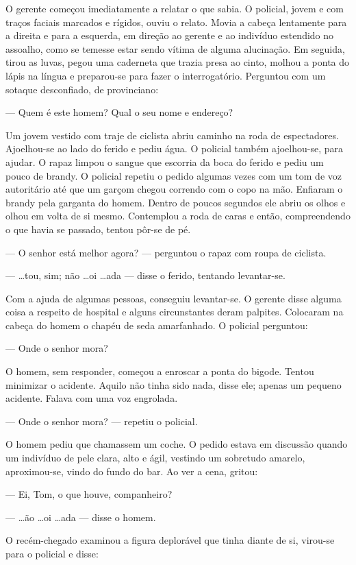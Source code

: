 O gerente começou imediatamente a relatar o que sabia. O policial,
jovem e com traços faciais marcados e rígidos, ouviu o relato. Movia a
cabeça lentamente para a direita e para a esquerda, em direção ao
gerente e ao indivíduo estendido no assoalho, como se temesse estar
sendo vítima de alguma alucinação. Em seguida, tirou as luvas, pegou
uma caderneta que trazia presa ao cinto, molhou a ponta do lápis na
língua e preparou-se para fazer o interrogatório. Perguntou com um
sotaque desconfiado, de provinciano:

--- Quem é este homem? Qual o seu nome e endereço?

Um jovem vestido com traje de ciclista abriu caminho na roda de
espectadores. Ajoelhou-se ao lado do ferido e pediu água. O policial
também ajoelhou-se, para ajudar. O rapaz limpou o sangue que
escorria da boca do ferido e pediu um pouco de brandy. O policial
repetiu o pedido algumas vezes com um tom de voz autoritário até que
um garçom chegou correndo com o copo na mão. Enfiaram o brandy pela
garganta do homem. Dentro de poucos segundos ele abriu os olhos e
olhou em volta de si mesmo. Contemplou a roda de caras e então,
compreendendo o que havia se passado, tentou pôr-se de pé.

--- O senhor está melhor agora? --- perguntou o rapaz com roupa de
ciclista.

--- \ldots{}tou, sim; não \ldots{}oi \ldots{}ada --- disse o ferido, tentando
levantar-se.

Com a ajuda de algumas pessoas, conseguiu levantar-se. O gerente
disse alguma coisa a respeito de hospital e alguns
circunstantes deram palpites. Colocaram na cabeça do homem o chapéu de seda
amarfanhado. O policial perguntou:

--- Onde o senhor mora?

O homem, sem responder, começou a enroscar a ponta do bigode. Tentou
minimizar o acidente. Aquilo não tinha sido nada, disse ele; apenas um
pequeno acidente. Falava com uma voz engrolada.

--- Onde o senhor mora? --- repetiu o policial.

O homem pediu que chamassem um coche. O pedido estava em discussão
quando um indivíduo de pele clara, alto e ágil, vestindo um sobretudo
amarelo, aproximou-se, vindo do fundo do bar. Ao ver a cena, gritou:

--- Ei, Tom, o que houve, companheiro?

--- \ldots{}ão \ldots{}oi \ldots{}ada --- disse o homem.

O recém-chegado examinou a figura deplorável que tinha diante de si,
virou-se para o policial e disse:

